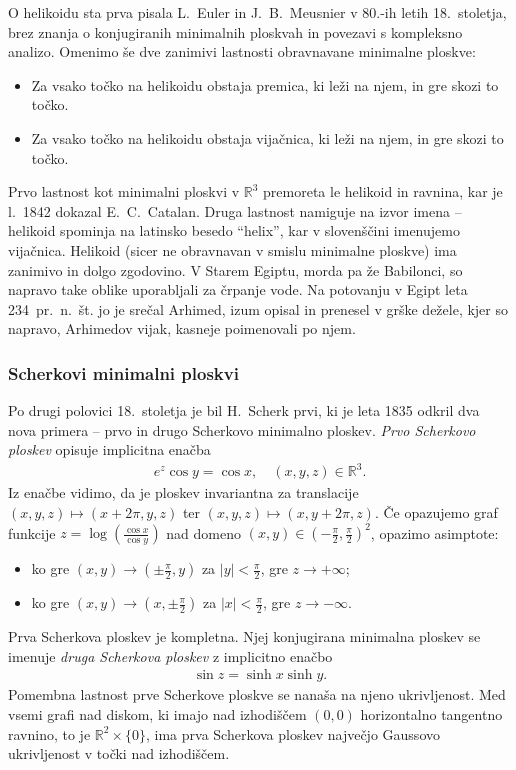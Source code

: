 \documentclass[12pt,a4paper,twoside]{article}
\theoremstyle{definition} %
\theoremstyle{plain} %
\numberwithin{equation}{section}  %
\newcommand{\R}{\mathbb R}
\begin{document}
O helikoidu sta prva pisala L.~Euler in J.~B.~Meusnier v 80.-ih letih 18.~stoletja, brez znanja o konjugiranih minimalnih ploskvah in povezavi s kompleksno analizo. Omenimo še dve zanimivi lastnosti obravnavane minimalne ploskve:
\begin{itemize}
\item Za vsako točko na helikoidu obstaja premica, ki leži na njem, in gre skozi to točko.
\item Za vsako točko na helikoidu obstaja vijačnica, ki leži na njem, in gre skozi to točko.
\end{itemize}
Prvo lastnost kot minimalni ploskvi v $\mathbb{R}^3$ premoreta le helikoid in ravnina, kar je l.~1842 dokazal E.~C.~Catalan. Druga lastnost namiguje na izvor imena -- helikoid spominja na latinsko besedo ``helix'', kar v slovenščini imenujemo vijačnica.
Helikoid (sicer ne obravnavan v smislu minimalne ploskve) ima zanimivo in dolgo zgodovino. V Starem Egiptu, morda pa že Babilonci, so napravo take oblike uporabljali za črpanje vode. Na potovanju v Egipt leta 234~pr.~n.~št. jo je srečal Arhimed, izum opisal in prenesel v grške dežele, kjer so napravo, Arhimedov vijak, kasneje poimenovali po njem.

\subsubsection{Scherkovi minimalni ploskvi}
% 
Po drugi polovici 18.~stoletja je bil H.~Scherk prvi, ki je leta 1835 odkril dva nova primera -- prvo in drugo Scherkovo minimalno ploskev. 
\emph{Prvo Scherkovo ploskev} opisuje implicitna enačba
\begin{gather}
e^{z} \cos y = \cos x, \quad (x,y,z) \in \R^3.
\end{gather}
Iz enačbe vidimo, da je ploskev invariantna za translacije $(x,y,z) \mapsto (x+2\pi,y,z)$ ter $(x,y,z) \mapsto (x,y+2\pi,z)$.
Če opazujemo graf funkcije $z = \log \left(\frac{\cos x}{\cos y} \right)$ nad domeno $(x,y) \in \left( -\frac{\pi}{2}, \frac{\pi}{2} \right)^2$, opazimo asimptote:
\begin{itemize}
\item ko gre $(x,y) \to \left( \pm \frac{\pi}{2}, y \right)$ za $|y| < \frac{\pi}{2}$, gre $z \to +\infty$;
\item ko gre $(x,y) \to \left( x, \pm \frac{\pi}{2} \right)$ za $|x| < \frac{\pi}{2}$, gre $z \to -\infty$.
\end{itemize}
Prva Scherkova ploskev je kompletna. 
Njej konjugirana minimalna ploskev se imenuje \emph{druga Scherkova ploskev} z implicitno enačbo
\begin{gather}
\sin z = \sinh x \sinh y.
\end{gather}
%
Pomembna lastnost prve Scherkove ploskve se nanaša na njeno ukrivljenost. Med vsemi grafi nad diskom, ki imajo nad izhodiščem $(0,0)$ horizontalno tangentno ravnino, to je $\R^2 \times \{0\}$, ima prva Scherkova ploskev največjo Gaussovo ukrivljenost v točki nad izhodiščem.
\end{document}
